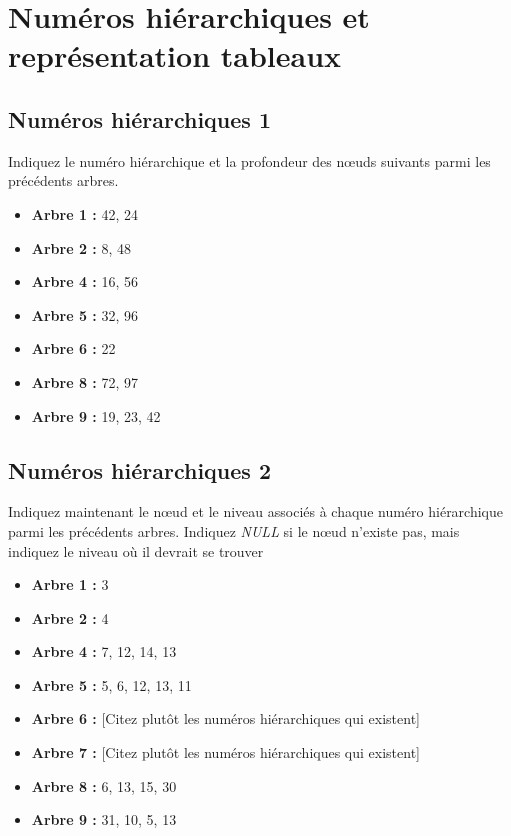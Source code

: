 \documentclass[11pt,a4paper]{article}
\begin{document}



\clearpage

\section{Numéros hiérarchiques et représentation tableaux}

\subsection{Numéros hiérarchiques 1}

Indiquez le numéro hiérarchique et la profondeur des nœuds suivants parmi les précédents arbres.

\begin{itemize}
\item \textbf{Arbre 1 : } 42, 24
\item \textbf{Arbre 2 : } 8, 48
\item \textbf{Arbre 4 : } 16, 56
\item \textbf{Arbre 5 : } 32, 96
\item \textbf{Arbre 6 : } 22
\item \textbf{Arbre 8 : } 72, 97
\item \textbf{Arbre 9 : } 19, 23, 42
\end{itemize}

\bigskip


\subsection{Numéros hiérarchiques 2}

Indiquez maintenant le nœud et le niveau associés à chaque numéro hiérarchique parmi les précédents arbres.
Indiquez \textit{NULL} si le nœud n'existe pas, mais indiquez le niveau où il devrait se trouver

\begin{itemize}
\item \textbf{Arbre 1 : } 3
\item \textbf{Arbre 2 : } 4
\item \textbf{Arbre 4 : } 7, 12, 14, 13
\item \textbf{Arbre 5 : } 5, 6, 12, 13, 11
\item \textbf{Arbre 6 : } [Citez plutôt les numéros hiérarchiques qui existent]
\item \textbf{Arbre 7 : } [Citez plutôt les numéros hiérarchiques qui existent]
\item \textbf{Arbre 8 : } 6, 13, 15, 30
\item \textbf{Arbre 9 : } 31, 10, 5, 13
\end{itemize}
\end{document}
